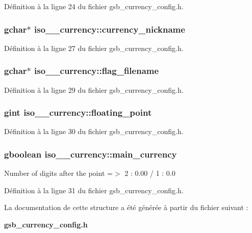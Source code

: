 Définition à la ligne 24 du fichier gsb\_\-currency\_\-config.h.

\subsubsection[{currency\_\-nickname}]{\setlength{\rightskip}{0pt plus 5cm}gchar$\ast$ {\bf iso\_\_\-currency::currency\_\-nickname}}\label{structiso__4217__currency_a4d881b537d1ea1195aa21c861abe7d97}


Définition à la ligne 27 du fichier gsb\_\-currency\_\-config.h.

\subsubsection[{flag\_\-filename}]{\setlength{\rightskip}{0pt plus 5cm}gchar$\ast$ {\bf iso\_\_\-currency::flag\_\-filename}}\label{structiso__4217__currency_a64691635052637b1bf957a4d63ec7eb1}


Définition à la ligne 29 du fichier gsb\_\-currency\_\-config.h.

\subsubsection[{floating\_\-point}]{\setlength{\rightskip}{0pt plus 5cm}gint {\bf iso\_\_\-currency::floating\_\-point}}\label{structiso__4217__currency_af9b15399a8b9d8195d7793950109f649}


Définition à la ligne 30 du fichier gsb\_\-currency\_\-config.h.

\subsubsection[{main\_\-currency}]{\setlength{\rightskip}{0pt plus 5cm}gboolean {\bf iso\_\_\-currency::main\_\-currency}}\label{structiso__4217__currency_a20eb4394628d748aecae06153b3192ec}
Number of digits after the point =$>$ 2 : 0.00 / 1 : 0.0 

Définition à la ligne 31 du fichier gsb\_\-currency\_\-config.h.



La documentation de cette structure a été générée à partir du fichier suivant :\begin{DoxyCompactItemize}
\item 
{\bf gsb\_\-currency\_\-config.h}\end{DoxyCompactItemize}
